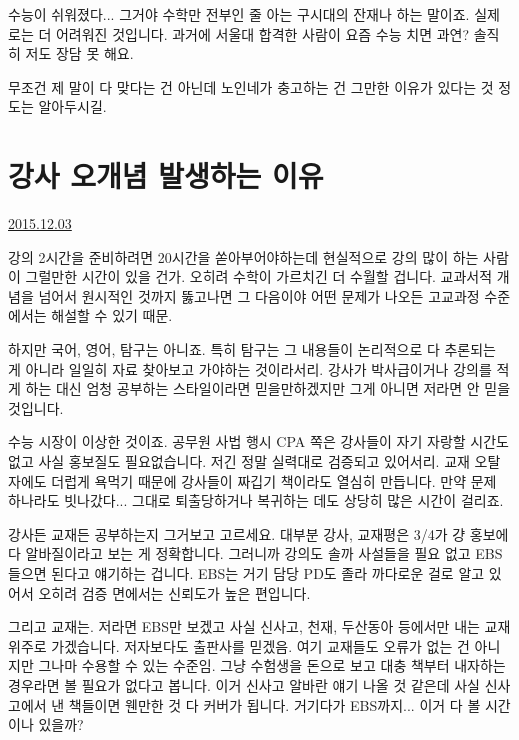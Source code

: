 수능이 쉬워졌다... 그거야 수학만 전부인 줄 아는 구시대의 잔재나 하는 말이죠.
실제로는 더 어려워진 것입니다.
과거에 서울대 합격한 사람이 요즘 수능 치면 과연? 솔직히 저도 장담 못 해요.
\vspace{5mm}

무조건 제 말이 다 맞다는 건 아닌데
노인네가 충고하는 건 그만한 이유가 있다는 것 정도는 알아두시길.
\vspace{5mm}









\section{강사 오개념 발생하는 이유}
\href{https://www.kockoc.com/Apoc/524777}{2015.12.03}

\vspace{5mm}

강의 2시간을 준비하려면 20시간을 쏟아부어야하는데
현실적으로 강의 많이 하는 사람이 그럴만한 시간이 있을 건가.
오히려 수학이 가르치긴 더 수월할 겁니다. 교과서적 개념을 넘어서 원시적인 것까지 뚫고나면
그 다음이야 어떤 문제가 나오든 고교과정 수준에서는 해설할 수 있기 때문.
\vspace{5mm}

하지만 국어, 영어, 탐구는 아니죠.
특히 탐구는 그 내용들이 논리적으로 다 추론되는 게 아니라 일일히 자료 찾아보고 가야하는 것이라서리.
강사가 박사급이거나 강의를 적게 하는 대신 엄청 공부하는 스타일이라면 믿을만하겠지만 그게 아니면 저라면 안 믿을 것입니다.
\vspace{5mm}

수능 시장이 이상한 것이죠.
공무원 사법 행시 CPA 쪽은 강사들이 자기 자랑할 시간도 없고 사실 홍보질도 필요없습니다.
저긴 정말 실력대로 검증되고 있어서리. 교재 오탈자에도 더럽게 욕먹기 때문에 강사들이 짜깁기 책이라도 열심히 만듭니다.
만약 문제 하나라도 빗나갔다... 그대로 퇴출당하거나 복귀하는 데도 상당히 많은 시간이 걸리죠.
\vspace{5mm}

강사든 교재든 공부하는지 그거보고 고르세요. 대부분 강사, 교재평은 3/4가 걍 홍보에다 알바질이라고 보는 게 정확합니다.
그러니까 강의도 솔까 사설들을 필요 없고 EBS 들으면 된다고 얘기하는 겁니다.
EBS는 거기 담당 PD도 졸라 까다로운 걸로 알고 있어서 오히려 검증 면에서는 신뢰도가 높은 편입니다.
\vspace{5mm}

그리고 교재는.
저라면 EBS만 보겠고 사실 신사고, 천재, 두산동아 등에서만 내는 교재 위주로 가겠습니다.
저자보다도 출판사를 믿겠음. 여기 교재들도 오류가 없는 건 아니지만 그나마 수용할 수 있는 수준임.
그냥 수험생을 돈으로 보고 대충 책부터 내자하는 경우라면 볼 필요가 없다고 봅니다.
이거 신사고 알바란 얘기 나올 것 같은데 사실 신사고에서 낸 책들이면 웬만한 것 다 커버가 됩니다.
거기다가 EBS까지... 이거 다 볼 시간이나 있을까?
\vspace{5mm}

